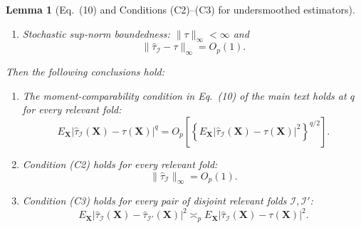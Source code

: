\documentclass[11pt]{article}
\theoremstyle{referenceplain}
\newtheorem{lemma}{Lemma}[section]
\theoremstyle{referencedefinition}
\theoremstyle{referenceremark}
\begin{document}
\begin{lemma}[Eq.~(10) and Conditions (C2)--(C3) for undersmoothed estimators]
\begin{enumerate}
\item[\textup{(U4)}] \textit{Stochastic sup-norm boundedness:}
$\|\tau\|_\infty<\infty$ and
\[
\|\widehat\tau_{\mathcal I}-\tau\|_\infty=O_p(1).
\]
\end{enumerate}
Then the following conclusions hold:
\begin{enumerate}
\item[\textup{(a)}] The moment-comparability condition in Eq.~(10) of the
main text holds at $q$ for every relevant fold:
\[
E_{\mathbf X}
|\widehat\tau_{\mathcal I}(\mathbf X)-\tau(\mathbf X)|^q
=O_p\left[
\left\{
E_{\mathbf X}
|\widehat\tau_{\mathcal I}(\mathbf X)-\tau(\mathbf X)|^2
\right\}^{q/2}
\right].
\]

\item[\textup{(b)}] Condition (C2) holds for every relevant fold:
\[
\|\widehat\tau_{\mathcal I}\|_\infty=O_p(1).
\]

\item[\textup{(c)}] Condition (C3) holds for every pair of disjoint relevant
folds $\mathcal I,\mathcal I'$:
\[
E_{\mathbf X}
|\widehat\tau_{\mathcal I}(\mathbf X)
-\widehat\tau_{\mathcal I'}(\mathbf X)|^2
\asymp_p
E_{\mathbf X}
|\widehat\tau_{\mathcal I}(\mathbf X)-\tau(\mathbf X)|^2.
\]
\end{enumerate}
\end{lemma}
\end{document}

